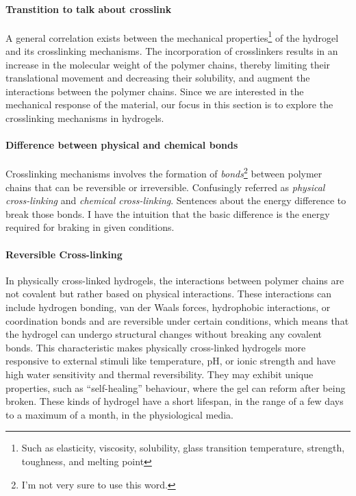 \paragraph{Transtition to talk about crosslink}
A general correlation exists between the mechanical properties\footnote{Such as elasticity, viscosity, solubility, glass transition temperature, strength, toughness, and melting point\citep{priyaComprehensiveReviewHydrogel2024}} of the hydrogel and its crosslinking mechanisms.
The incorporation of crosslinkers results in an increase in the molecular weight of the polymer chains, thereby limiting their translational movement and decreasing their solubility, and augment the interactions between the polymer chains\citep{priyaComprehensiveReviewHydrogel2024}.
Since we are interested in the mechanical response of the material, our focus in this section is to explore the crosslinking mechanisms in hydrogels.

\paragraph{Difference between physical and chemical bonds}
Crosslinking mechanisms involves the formation of \textit{bonds}\footnote{I'm not very sure to use this word.} between polymer chains that can be reversible or irreversible.
Confusingly referred as \textit{physical cross-linking} and \textit{chemical cross-linking}.
Sentences about the energy difference to break those bonds.
I have the intuition that the basic difference is the energy required for braking in given conditions.


\paragraph{Reversible Cross-linking}\citep{priyaComprehensiveReviewHydrogel2024}
In physically cross-linked hydrogels, the interactions between polymer chains are not covalent but rather based on physical interactions. 
These interactions can include hydrogen bonding, van der Waals forces, hydrophobic interactions, or coordination bonds and are reversible under certain conditions, which means that the hydrogel can undergo structural changes without breaking any covalent bonds.
This characteristic makes physically cross-linked hydrogels more responsive to external stimuli like temperature, pH, or ionic strength and have high water sensitivity and thermal reversibility. 
They may exhibit unique properties, such as “self-healing” behaviour, where the gel can reform after being broken.
These kinds of hydrogel have a short lifespan, in the range of a few days to a maximum of a month, in the physiological media. 

